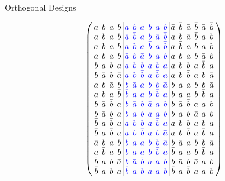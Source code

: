 \documentclass{beamer}
\newcommand{\bblue}[1]{\textcolor{blue}{#1}}
\begin{document}
\begin{frame}{Orthogonal Designs}

  \[
    \arraycolsep=2.0pt\def\arraystretch{0.75}
    \left(
      \begin{array}{cccc|cccccc|cccccc}
        a&b&a&b&\bblue{a}&\bblue{b}&\bblue{a}&\bblue{b}&\bblue{a}&\bblue{b}&\bar{a}&\bar{b}&\bar{a}&\bar{b}&\bar{a}&\bar{b}\\
        a&b&a&b&\bblue{\bar{a}}&\bblue{\bar{b}}&\bblue{a}&\bblue{b}&\bblue{\bar{a}}&\bblue{\bar{b}}&a&b&\bar{a}&\bar{b}&a&b\\
        a&b&a&b&\bblue{a}&\bblue{b}&\bblue{\bar{a}}&\bblue{\bar{b}}&\bblue{\bar{a}}&\bblue{\bar{b}}&\bar{a}&\bar{b}&a&b&a&b\\
        a&b&a&b&\bblue{\bar{a}}&\bblue{\bar{b}}&\bblue{\bar{a}}&\bblue{\bar{b}}&\bblue{a}&\bblue{b}&a&b&a&b&\bar{a}&\bar{b}\\
        b&\bar{a}&b&\bar{a}&\bblue{a}&\bblue{b}&\bblue{b}&\bblue{\bar{a}}&\bblue{b}&\bblue{\bar{a}}&a&b&b&\bar{a}&\bar{b}&a\\
        b&\bar{a}&b&\bar{a}&\bblue{a}&\bblue{b}&\bblue{\bar{b}}&\bblue{a}&\bblue{\bar{b}}&\bblue{a}&a&b&\bar{b}&a&b&\bar{a}\\
        a&b&\bar{a}&\bar{b}&\bblue{b}&\bblue{\bar{a}}&\bblue{a}&\bblue{b}&\bblue{b}&\bblue{\bar{a}}&\bar{b}&a&a&b&b&\bar{a}\\
        a&b&\bar{a}&\bar{b}&\bblue{\bar{b}}&\bblue{a}&\bblue{a}&\bblue{b}&\bblue{\bar{b}}&\bblue{a}&b&\bar{a}&a&b&\bar{b}&a\\
        b&\bar{a}&\bar{b}&a&\bblue{b}&\bblue{\bar{a}}&\bblue{b}&\bblue{\bar{a}}&\bblue{a}&\bblue{b}&b&\bar{a}&\bar{b}&a&a&b\\
        b&\bar{a}&\bar{b}&a&\bblue{\bar{b}}&\bblue{a}&\bblue{\bar{b}}&\bblue{a}&\bblue{a}&\bblue{b}&\bar{b}&a&b&\bar{a}&a&b\\
        \bar{b}&a&\bar{b}&a&\bblue{a}&\bblue{b}&\bblue{b}&\bblue{\bar{a}}&\bblue{\bar{b}}&\bblue{a}&a&b&b&\bar{a}&b&\bar{a}\\
        \bar{b}&a&\bar{b}&a&\bblue{a}&\bblue{b}&\bblue{\bar{b}}&\bblue{a}&\bblue{b}&\bblue{\bar{a}}&a&b&\bar{b}&a&\bar{b}&a\\
        \bar{a}&\bar{b}&a&b&\bblue{\bar{b}}&\bblue{a}&\bblue{a}&\bblue{b}&\bblue{b}&\bblue{\bar{a}}&b&\bar{a}&a&b&b&\bar{a}\\
        \bar{a}&\bar{b}&a&b&\bblue{b}&\bblue{\bar{a}}&\bblue{a}&\bblue{b}&\bblue{\bar{b}}&\bblue{a}&\bar{b}&a&a&b&\bar{b}&a\\
        \bar{b}&a&b&\bar{a}&\bblue{b}&\bblue{\bar{a}}&\bblue{\bar{b}}&\bblue{a}&\bblue{a}&\bblue{b}&b&\bar{a}&b&\bar{a}&a&b\\
        \bar{b}&a&b&\bar{a}&\bblue{\bar{b}}&\bblue{a}&\bblue{b}&\bblue{\bar{a}}&\bblue{a}&\bblue{b}&\bar{b}&a&\bar{b}&a&a&b\\
      \end{array}
    \right)
  \]

\end{frame}
\end{document}
